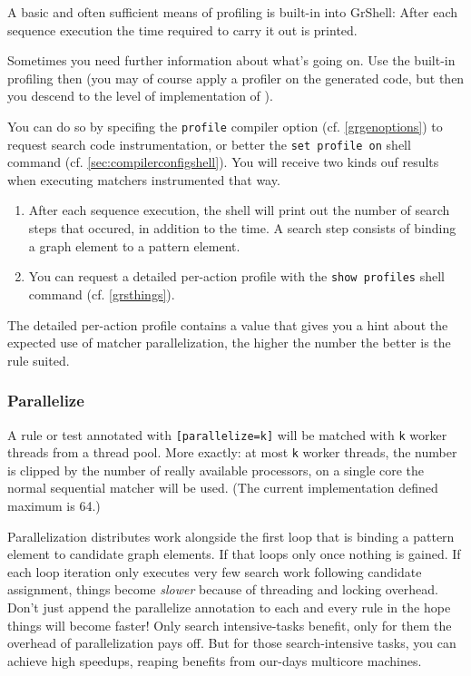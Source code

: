 A basic and often sufficient means of profiling is built-in into GrShell:
After each sequence execution the time required to carry it out is printed.

Sometimes you need further information about what's going on.
Use the built-in profiling then (you may of course apply a profiler on the generated code, but then you descend to the level of implementation of \GrG).

You can do so by specifing the \texttt{profile} compiler option (cf. \ref{grgenoptions}) to request search code instrumentation, or better the \texttt{set profile on} shell command (cf. \ref{sec:compilerconfigshell}).
You will receive two kinds ouf results when executing matchers instrumented that way.

\begin{enumerate}
	\item After each sequence execution, the shell will print out the number of search steps that occured, in addition to the time. A search step consists of binding a graph element to a pattern element.
	\item You can request a detailed per-action profile with the \texttt{show profiles} shell command (cf. \ref{grsthings}).
\end{enumerate}

The detailed per-action profile contains a value that gives you a hint about the expected use of matcher parallelization, the higher the number the better is the rule suited.

\subsubsection*{Parallelize}
A rule or test annotated with \texttt{[parallelize=k]} will be matched with \texttt{k} worker threads from a thread pool.
More exactly: at most \texttt{k} worker threads, the number is clipped by the number of really available processors, on a single core the normal sequential matcher will be used.
(The current implementation defined maximum is 64.)

Parallelization distributes work alongside the first loop that is binding a pattern element to candidate graph elements.
If that loops only once nothing is gained.
If each loop iteration only executes very few search work following candidate assignment,
things become \emph{slower} because of threading and locking overhead.
Don't just append the parallelize annotation to each and every rule in the hope things will become faster!
Only search intensive-tasks benefit, only for them the overhead of parallelization pays off.
But for those search-intensive tasks, you can achieve high speedups, reaping benefits from our-days multicore machines. 

